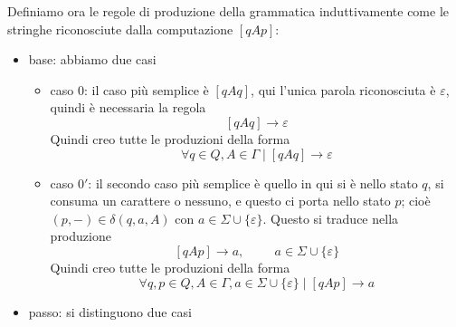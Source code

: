 \documentclass[12pt]{report}
\theoremstyle{definition}
\theoremstyle{regard}
\begin{document}
Definiamo ora le regole di produzione della grammatica induttivamente come le stringhe riconosciute dalla computazione $[qAp]$:
\begin{itemize}
	\item base: abbiamo due casi
		\begin{itemize}
			\item caso $0$: il caso più semplice è $[qAq]$, qui l'unica parola riconosciuta è $\varepsilon$, quindi è necessaria la regola
				$$ [qAq] \rightarrow \varepsilon $$
				Quindi creo tutte le produzioni della forma
				$$ \forall q \in Q, A \in \Gamma \mid [qAq] \rightarrow \varepsilon $$	%
			\item caso $0'$: il secondo caso più semplice è quello in qui si è nello stato $q$, si consuma un carattere o nessuno, e questo ci porta nello stato $p$; cioè $(p, -) \in \delta(q, a, A)$ con $a \in \Sigma \cup \{\varepsilon\}$.
				Questo si traduce nella produzione
				$$ [qAp] \rightarrow a, \hspace{1cm} a \in \Sigma \cup \{\varepsilon\} $$
				Quindi creo tutte le produzioni della forma
				$$ \forall q, p \in Q, A \in \Gamma, a \in \Sigma \cup \{\varepsilon\} \mid [qAp] \rightarrow a $$
		\end{itemize}
	\item passo: si distinguono due casi
		\begin{figure}[H]
			\centering
			\begin{subfigure}{0.45\textwidth}
				\centering
\end{subfigure}
\end{figure}
\end{itemize}
\end{document}
